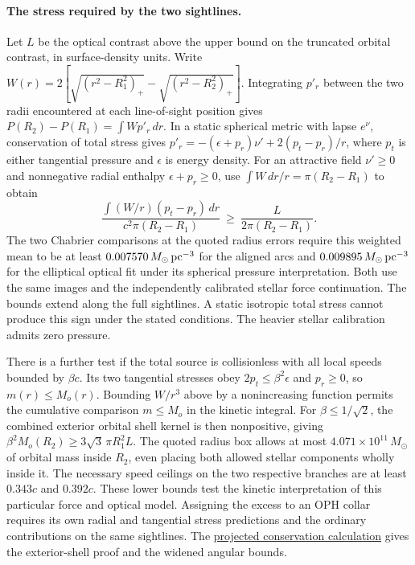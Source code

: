\documentclass[11pt]{article}
\begin{document}
\paragraph{The stress required by the two sightlines.}
Let $L$ be the optical contrast above the upper bound on the truncated
orbital contrast, in surface-density units. Write
$W(r)=2[\sqrt{(r^2-R_1^2)_+}-\sqrt{(r^2-R_2^2)_+}]$.
Integrating $p'_r$ between the two radii encountered at each
line-of-sight position gives $P(R_2)-P(R_1)=\int W p'_r\,dr$.
In a static spherical metric with lapse $e^\nu$, conservation of total
stress gives $p'_r=-(\epsilon+p_r)\nu'+2(p_t-p_r)/r$, where $p_t$
is either tangential pressure and $\epsilon$ is energy density.
For an attractive field $\nu'\ge0$ and nonnegative radial enthalpy
$\epsilon+p_r\ge0$, use $\int W\,dr/r=\pi(R_2-R_1)$ to obtain
\[
 \frac{\int (W/r)(p_t-p_r)\,dr}{c^2\pi(R_2-R_1)}
 \ \ge\ \frac{L}{2\pi(R_2-R_1)} .
\]
The two Chabrier comparisons at the quoted radius errors require this
weighted mean to be at least $0.007570\,M_\odot\,{\rm pc}^{-3}$ for
the aligned arcs and $0.009895\,M_\odot\,{\rm pc}^{-3}$ for the
elliptical optical fit under its spherical pressure interpretation.
Both use the same images and the independently calibrated stellar
force continuation. The bounds extend along the full sightlines.
A static isotropic total stress cannot produce this sign under the
stated conditions. The heavier stellar calibration admits zero pressure.

There is a further test if the total source is collisionless with all
local speeds bounded by $\beta c$. Its two tangential stresses obey
$2p_t\le\beta^2\epsilon$ and $p_r\ge0$, so $m(r)\le M_o(r)$.
Bounding $W/r^3$ above by a nonincreasing function permits the cumulative
comparison $m\le M_o$ in the kinetic integral. For $\beta\le1/\sqrt2$,
the combined exterior orbital shell kernel is then nonpositive, giving
$\beta^2 M_o(R_2)\ge3\sqrt3\,\pi R_1^2 L$. The quoted radius box
allows at most $4.071\times10^{11}\,M_\odot$ of orbital mass inside
$R_2$, even placing both allowed stellar components wholly inside it.
The necessary speed ceilings on the two respective branches are at
least $0.343c$ and $0.392c$. These lower bounds test the kinetic
interpretation of this particular force and optical model. Assigning
the excess to an OPH collar requires its own radial and tangential
stress predictions and the ordinary contributions on the same sightlines.
The \href{https://github.com/FloatingPragma/observer-patch-holography/tree/main/code/cosmology/rar_deep_regime/double_ring_pressure/stress_conservation}{projected conservation calculation}
gives the exterior-shell proof and the widened angular bounds.
\end{document}
